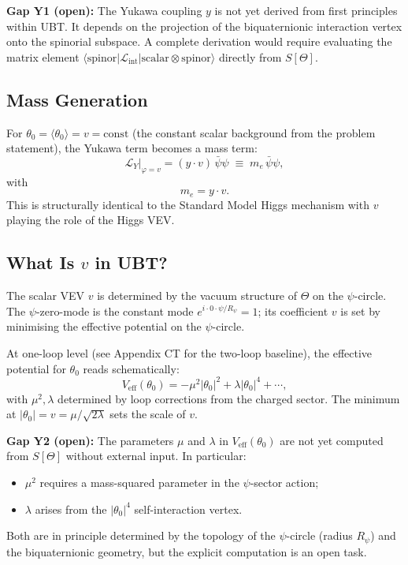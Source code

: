 \documentclass[12pt]{article}
\theoremstyle{definition}
\theoremstyle{remark}
\begin{document}
\begin{gapbox}
\textbf{Gap Y1 (open):} The Yukawa coupling $y$ is not yet derived from first principles
within UBT.  It depends on the projection of the biquaternionic interaction vertex onto
the spinorial subspace.  A complete derivation would require evaluating the matrix element
$\langle\mathrm{spinor}|\mathcal{L}_\mathrm{int}|\mathrm{scalar}\otimes\mathrm{spinor}\rangle$
directly from $S[\Theta]$.
\end{gapbox}

\subsection{Mass Generation}

For $\theta_0 = \langle\theta_0\rangle = v = \mathrm{const}$ (the constant scalar background
from the problem statement), the Yukawa term becomes a mass term:
\begin{equation}
  \mathcal{L}_Y\big|_{\varphi=v} = (y\cdot v)\,\bar\psi\psi \;\equiv\; m_e\,\bar\psi\psi,
\end{equation}
with
\begin{equation}
  \boxed{m_e = y\cdot v.}
\end{equation}
This is structurally identical to the Standard Model Higgs mechanism with $v$ playing the
role of the Higgs VEV.

\subsection{What Is $v$ in UBT?}

The scalar VEV $v$ is determined by the vacuum structure of $\Theta$ on the $\psi$-circle.
The $\psi$-zero-mode is the constant mode $e^{i\cdot0\cdot\psi/R_\psi} = 1$; its
coefficient $v$ is set by minimising the effective potential on the $\psi$-circle.

At one-loop level (see Appendix CT for the two-loop baseline), the effective potential
for $\theta_0$ reads schematically:
\begin{equation}
  V_\mathrm{eff}(\theta_0)
  = -\mu^2|\theta_0|^2 + \lambda|\theta_0|^4 + \cdots,
\end{equation}
with $\mu^2, \lambda$ determined by loop corrections from the charged sector.  The
minimum at $|\theta_0| = v = \mu/\sqrt{2\lambda}$ sets the scale of $v$.

\begin{gapbox}
\textbf{Gap Y2 (open):} The parameters $\mu$ and $\lambda$ in $V_\mathrm{eff}(\theta_0)$
are not yet computed from $S[\Theta]$ without external input.  In particular:
\begin{itemize}
  \item $\mu^2$ requires a mass-squared parameter in the $\psi$-sector action;
  \item $\lambda$ arises from the $|\theta_0|^4$ self-interaction vertex.
\end{itemize}
Both are in principle determined by the topology of the $\psi$-circle (radius $R_\psi$)
and the biquaternionic geometry, but the explicit computation is an open task.
\end{gapbox}
\end{document}
